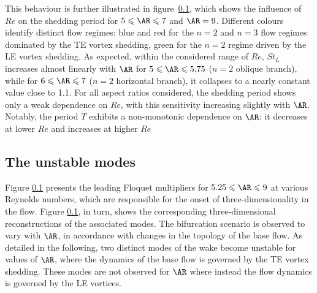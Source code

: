 This behaviour is further illustrated in figure~\ref{}, which shows the influence of $Re$ on the shedding period for $5 \le \AR \le 7$ and $\AR = 9$. Different colours identify distinct flow regimes: blue and red for the $n = 2$ and $n=3$ flow regimes dominated by the TE vortex shedding, green for the $n = 2$ regime driven by the LE vortex shedding. As expected, within the considered range of $Re$, $St_L$ increases almost linearly with $\AR$ for $5 \le \AR \le 5.75$ ($n = 2$ oblique branch), while for $6 \le \AR \le 7$ ($n=2$ horizontal branch), it collapses to a nearly constant value close to 1.1. For all aspect ratios considered, the shedding period shows only a weak dependence on $Re$, with this sensitivity increasing slightly with $\AR$. Notably, the period $T$ exhibits a non-monotonic dependence on $\AR$: it decreases at lower $Re$ and increases at higher $Re$

\subsection{The unstable modes}

Figure \ref{} presents the leading Floquet multipliers for $5.25 \le \AR \le 9$ at various Reynolds numbers, which are responsible for the onset of three-dimensionality in the flow. Figure \ref{}, in turn, shows the corresponding three-dimensional reconstructions of the associated modes. The bifurcation scenario is observed to vary with $\AR$, in accordance with changes in the topology of the base flow. As detailed in the following, two distinct modes of the wake become unstable for values of $\AR$, where the dynamics of the base flow is governed by the TE vortex shedding. These modes are not observed for $\AR$ where instead the flow dynamics is governed by the LE vortices.


